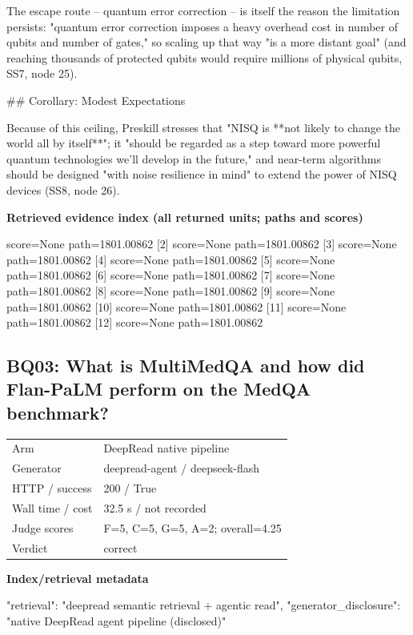\documentclass[10pt]{article}
\begin{document}
\begin{AnswerText}
The escape route -- quantum error correction -- is itself the reason the limitation persists: "quantum error correction imposes a heavy overhead cost in number of qubits and number of gates," so scaling up that way "is a more distant goal" (and reaching thousands of protected qubits would require millions of physical qubits, SS7, node 25).

## Corollary: Modest Expectations

Because of this ceiling, Preskill stresses that "NISQ is **not likely to change the world all by itself**"; it "should be regarded as a step toward more powerful quantum technologies we'll develop in the future," and near-term algorithms should be designed "with noise resilience in mind" to extend the power of NISQ devices (SS8, node 26).
\end{AnswerText}

\textbf{Retrieved evidence index (all returned units; paths and scores) }
\begin{EvidenceText}
[1] score=None path=1801.00862
[2] score=None path=1801.00862
[3] score=None path=1801.00862
[4] score=None path=1801.00862
[5] score=None path=1801.00862
[6] score=None path=1801.00862
[7] score=None path=1801.00862
[8] score=None path=1801.00862
[9] score=None path=1801.00862
[10] score=None path=1801.00862
[11] score=None path=1801.00862
[12] score=None path=1801.00862
\end{EvidenceText}
\subsection{BQ03: What is MultiMedQA and how did Flan-PaLM perform on the MedQA benchmark?}
\begin{tabular}{@{}ll@{}}
Arm & DeepRead native pipeline\\
Generator & deepread-agent / deepseek-flash\\
HTTP / success & 200 / True\\
Wall time / cost & 32.5 s / not recorded\\
Judge scores & F=5, C=5, G=5, A=2; overall=4.25\\
Verdict & correct\\
\end{tabular}

\textbf{Index/retrieval metadata}
\begin{EvidenceText}
{
  "retrieval": "deepread semantic retrieval + agentic read",
  "generator_disclosure": "native DeepRead agent pipeline (disclosed)"
}
\end{EvidenceText}
\end{document}
